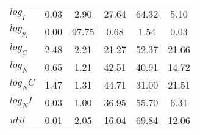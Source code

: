 \begin{center}
\begin{longtable}{lccccc}
$log_I     $	 & 	        0.03	 & 	        2.90	 & 	       27.64	 & 	       64.32	 & 	        5.10 \\ 
$log_p_I   $	 & 	        0.00	 & 	       97.75	 & 	        0.68	 & 	        1.54	 & 	        0.03 \\ 
$log_C     $	 & 	        2.48	 & 	        2.21	 & 	       21.27	 & 	       52.37	 & 	       21.66 \\ 
$log_N     $	 & 	        0.65	 & 	        1.21	 & 	       42.51	 & 	       40.91	 & 	       14.72 \\ 
$log_NC    $	 & 	        1.47	 & 	        1.31	 & 	       44.71	 & 	       31.00	 & 	       21.51 \\ 
$log_NI    $	 & 	        0.03	 & 	        1.00	 & 	       36.95	 & 	       55.70	 & 	        6.31 \\ 
$util      $	 & 	        0.01	 & 	        2.05	 & 	       16.04	 & 	       69.84	 & 	       12.06 \\ 
\end{longtable}
 \end{center}
